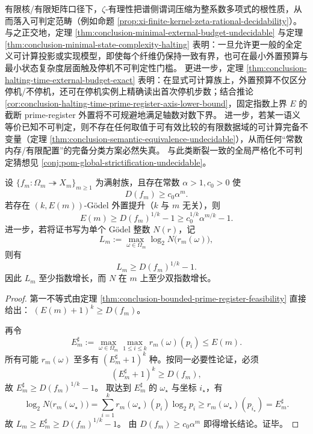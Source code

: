 






\begin{remark}[可审计切片与不可判定断裂的并置]\label{rem:conclusion-decidable-slice-vs-halting-wall}
有限核/有限矩阵口径下，\(\zeta\)-有理性把谱侧谓词压缩为整系数多项式的根性质，从而落入可判定范畴（例如命题 \ref{prop:xi-finite-kernel-zeta-rational-decidability}）。
与之正交地，定理 \ref{thm:conclusion-minimal-external-budget-undecidable} 与定理 \ref{thm:conclusion-minimal-state-complexity-halting} 表明：一旦允许更一般的全定义可计算投影或实现模型，即使每个纤维仍保持一致有界，也可在最小外置预算与最小状态复杂度层面触及停机不可判定性门槛。
更进一步，定理 \ref{thm:conclusion-halting-time-external-budget-exact} 表明：在显式可计算族上，外置预算不仅区分停机/不停机，还可在停机实例上精确读出首次停机步数；结合推论 \ref{cor:conclusion-halting-time-prime-register-axis-lower-bound}，固定指数上界 \(E\) 的截断 prime-register 外置将不可规避地满足轴数对数下界。
进一步，若某一语义等价已知不可判定，则不存在任何取值于可有效比较的有限数据域的可计算完备不变量（定理 \ref{thm:conclusion-semantic-equivalence-undecidable}），从而任何“常数内存/有限配置”的完备分类方案必然失真。
与此类断裂一致的全局严格化不可判定猜想见 \ref{conj:pom-global-strictification-undecidable}。
\end{remark}

\begin{corollary}[固定素数轴数下的指数幅度爆炸]\label{cor:conclusion-fixed-axis-exponential-amplitude}
设 \(\{f_m:\Omega_m\twoheadrightarrow X_m\}_{m\ge 1}\) 为满射族，且存在常数 \(\alpha>1,c_0>0\) 使
\[
D(f_m)\ge c_0\alpha^m.
\]
若存在 \((k,E(m))\)-Gödel 外置提升（\(k\) 与 \(m\) 无关），则
\[
E(m)\ge D(f_m)^{1/k}-1\ge c_0^{1/k}\alpha^{m/k}-1.
\]
进一步，若将证书写为单个 Gödel 整数 \(N(r)\)，记
\[
L_m:=\max_{\omega\in\Omega_m}\log_2 N\!\bigl(r_m(\omega)\bigr),
\]
则有
\[
L_m\ge D(f_m)^{1/k}-1.
\]
因此 \(L_m\) 至少指数增长，而 \(N\) 在 \(m\) 上至少双指数增长。
\end{corollary}
\begin{proof}
第一不等式由定理 \ref{thm:conclusion-bounded-prime-register-feasibility} 直接给出：
\((E(m)+1)^k\ge D(f_m)\)。

再令
\[
E_m^\sharp:=\max_{\omega\in\Omega_m}\max_{1\le i\le k} r_m(\omega)(p_i)\le E(m).
\]
所有可能 \(r_m(\omega)\) 至多有 \((E_m^\sharp+1)^k\) 种。按同一必要性论证，必须
\[
(E_m^\sharp+1)^k\ge D(f_m),
\]
故 \(E_m^\sharp\ge D(f_m)^{1/k}-1\)。
取达到 \(E_m^\sharp\) 的 \(\omega_\star\) 与坐标 \(i_\star\)，有
\[
\log_2 N\!\bigl(r_m(\omega_\star)\bigr)
=\sum_{i=1}^k r_m(\omega_\star)(p_i)\log_2 p_i
\ge r_m(\omega_\star)(p_{i_\star})
=E_m^\sharp.
\]
故 \(L_m\ge E_m^\sharp\ge D(f_m)^{1/k}-1\)。
由 \(D(f_m)\ge c_0\alpha^m\) 即得增长结论。证毕。
\end{proof}

